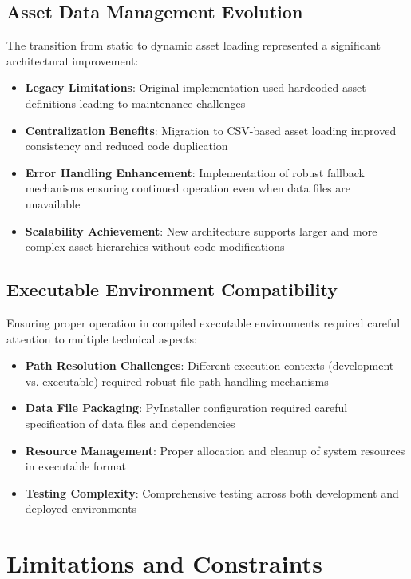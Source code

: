\documentclass[binding=0.6cm]{sapthesis}
\begin{document}
\subsection{Asset Data Management Evolution}

The transition from static to dynamic asset loading represented a significant architectural improvement:

\begin{itemize}
    \item \textbf{Legacy Limitations}: Original implementation used hardcoded asset definitions leading to maintenance challenges
    \item \textbf{Centralization Benefits}: Migration to CSV-based asset loading improved consistency and reduced code duplication
    \item \textbf{Error Handling Enhancement}: Implementation of robust fallback mechanisms ensuring continued operation even when data files are unavailable
    \item \textbf{Scalability Achievement}: New architecture supports larger and more complex asset hierarchies without code modifications
\end{itemize}

\subsection{Executable Environment Compatibility}

Ensuring proper operation in compiled executable environments required careful attention to multiple technical aspects:

\begin{itemize}
    \item \textbf{Path Resolution Challenges}: Different execution contexts (development vs. executable) required robust file path handling mechanisms
    \item \textbf{Data File Packaging}: PyInstaller configuration required careful specification of data files and dependencies
    \item \textbf{Resource Management}: Proper allocation and cleanup of system resources in executable format
    \item \textbf{Testing Complexity}: Comprehensive testing across both development and deployed environments
\end{itemize}

\section{Limitations and Constraints}
\end{document}
